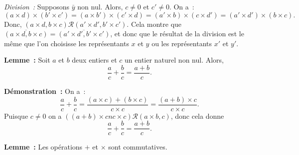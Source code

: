 \noindent\emph{Division :} Supposons $\bar{y}$ non nul. Alors, $c \neq 0$ et $c' \neq 0$.
    On a :
    \begin{equation*}
        (a \times d) \times (b' \times c')
        = (a \times b') \times (c' \times d)
        = (a' \times b) \times (c \times d')
        = (a' \times d') \times (b \times c) .
    \end{equation*}
    Donc, $(a \times d, b \times c) \mathrel{\mathcal{R}} (a' \times d', b' \times c')$. 
    Cela montre que $\overline{(a \times d, b \times c)} = \overline{(a' \times d', b' \times c')}$, et donc que le résultat de la division est le même que l'on choisisse les représentants $x$ et $y$ ou les représentants $x'$ et $y'$.

\done

\medskip

\noindent\textbf{Lemme :} Soit $a$ et $b$ deux entiers et $c$ un entier naturel non nul.
    Alors,
    \begin{equation*}
        \frac{a}{c} + \frac{b}{c} = \frac{a + b}{c}.
    \end{equation*}

\medskip

\noindent\textbf{Démonstration :} On a : 
    \begin{equation*}
        \frac{a}{c} + \frac{b}{c} 
        = \frac{(a \times c) + (b \times c)}{c \times c}
        = \frac{(a + b) \times c}{c \times c}.
    \end{equation*}
    Puisque $c \neq 0$ on a $((a + b) \times cn c \times c) \mathrel{\mathcal{R}} (a \times b, c)$, donc cela donne 
    \begin{equation*}
        \frac{a}{c} + \frac{b}{c} 
        = \frac{a + b}{c}.
    \end{equation*}

    \done

\medskip

\noindent\textbf{Lemme :} Les opérations $+$ et $\times$ sont commutatives.

\medskip

